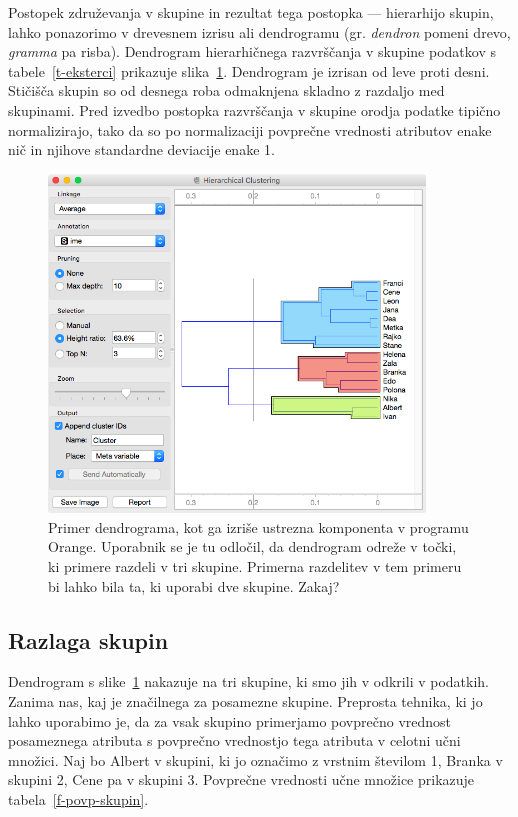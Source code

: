 Postopek združevanja v skupine in rezultat tega postopka ---
hierarhijo skupin, lahko ponazorimo v drevesnem izrisu ali dendrogramu
(gr. {\em dendron} pomeni drevo, {\em gramma} pa risba). Dendrogram
hierarhičnega razvrščanja v skupine podatkov s tabele~\ref{t-eksterci}
prikazuje slika~\ref{f-dendrogram}. Dendrogram je izrisan od leve
proti desni. Stičišča skupin so od desnega roba odmaknjena skladno z
razdaljo med skupinami. Pred izvedbo postopka razvrščanja v skupine
orodja podatke tipično normalizirajo, tako da so po normalizaciji
povprečne vrednosti atributov enake nič in njihove standardne
deviacije enake 1.

\begin{figure}[htbp]
\begin{center}
\includegraphics[width=10cm]{slike/dendrogram.png}
\caption{Primer dendrograma, kot ga izriše ustrezna komponenta v
  programu Orange. Uporabnik se je tu odločil, da dendrogram odreže v
  točki, ki primere razdeli v tri skupine. Primerna razdelitev v
  tem primeru bi lahko bila ta, ki uporabi dve skupine. Zakaj?}
\label{f-dendrogram}
\end{center}
\end{figure}

\subsection{Razlaga skupin}

Dendrogram s slike~\ref{f-dendrogram} nakazuje na tri skupine, ki smo
jih v odkrili v podatkih. Zanima nas, kaj je značilnega za posamezne
skupine. Preprosta tehnika, ki jo lahko uporabimo je, da za vsak
skupino primerjamo povprečno
vrednost posameznega atributa s povprečno vrednostjo tega atributa v
celotni učni množici. Naj bo Albert v skupini, ki jo označimo z
vrstnim številom 1, Branka v skupini 2, Cene pa v skupini 3. Povprečne
vrednosti učne množice prikazuje tabela~\ref{f-povp-skupin}.

